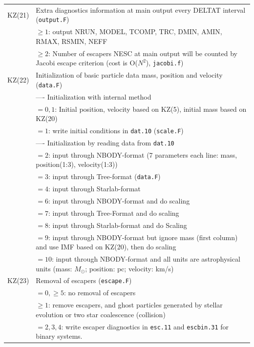 \begin{longtable}{@{}p{1.5cm}p{13.0cm}}
KZ(21)  & Extra diagnostics information at main output every DELTAT interval (\texttt{output.F}) \\
        & $\ge 1$: output NRUN, MODEL, TCOMP, TRC, DMIN, AMIN, RMAX, RSMIN, NEFF \\
        & $\ge 2$: Number of escapers NESC at main output will be counted by Jacobi escape criterion (cost is O($N^2$), \texttt{jacobi.f}) \\
KZ(22)  & Initialization of basic particle data mass, position and velocity (\texttt{data.F}) \\
        & ---- Initialization with internal method \\
        & $=0,1$: Initial position, velocity based on KZ(5), initial mass based on KZ(20) \\
        & $=1$: write initial conditions in \texttt{dat.10} (\texttt{scale.F}) \\
        & ---- Initialization by reading data from \texttt{dat.10} \\
        & $=2$: input through NBODY-format (7 parameters each line: mass, position(1:3), velocity(1:3))\\
        & $=3$: input through Tree-format (\texttt{data.F}) \\
        & $=4$: input through Starlab-format \\
        & $=6$: input through NBODY-format and do scaling\\
        & $=7$: input through Tree-Format and do scaling\\
        & $=8$: input through Starlab-format and do Scaling\\
        & $=9$: input through NBODY-format but ignore mass (first column) and use IMF based on KZ(20), then do scaling \\
        & $=10$: input through NBODY-format and all units are astrophysical units (mass: $M_\odot$; position: pc; velocity: km/s)\\
KZ(23)  & Removal of escapers (\texttt{escape.F})\\
        & $= 0, \ge 5$: no removal of escapers \\ 
        & $\ge 1$: remove escapers, and ghost particles generated by stellar evolution or two star coalescence (collision) \\
        & $=2,3,4$: write escaper diagnostics in \texttt{esc.11} and \texttt{escbin.31} for binary systems. \\

\end{longtable}

